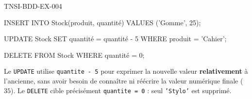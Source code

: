 \begin{corrige}{TNSI-BDD-EX-004}
\begin{sql}
INSERT INTO Stock(produit, quantité) VALUES ('Gomme', 25);

UPDATE Stock SET quantité = quantité - 5 WHERE produit = 'Cahier';

DELETE FROM Stock WHERE quantité = 0;
\end{sql}
Le \texttt{UPDATE} utilise \texttt{quantite - 5} pour exprimer la nouvelle valeur \textbf{relativement} à l'ancienne, sans avoir besoin de connaître ni réécrire la valeur numérique finale ($35$). Le \texttt{DELETE} cible précisément \texttt{quantite = 0} : seul \texttt{'Stylo'} est supprimé.
\end{corrige}
